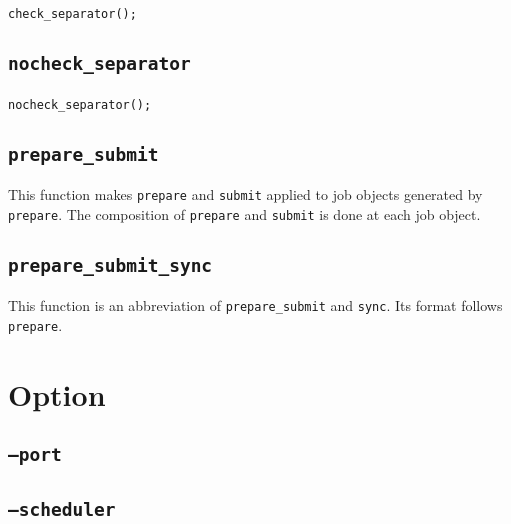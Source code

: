 \documentclass[a4paper,10pt]{report}
\begin{document}
\begin{boxnote}
\begin{alltt}
check_separator();
\end{alltt}
\end{boxnote}
\vspace{\baselineskip}

\section{\texttt{nocheck\_separator}}

\subsubsection{\format}

\begin{boxnote}
\begin{alltt}
nocheck_separator();
\end{alltt}
\end{boxnote}
\vspace{\baselineskip}

\section{\texttt{prepare\_submit}}

This function makes \texttt{prepare} and \texttt{submit} applied to
job objects generated by \texttt{prepare}.  The composition of
\texttt{prepare} and \texttt{submit} is done at each job object.

\section{\texttt{prepare\_submit\_sync}}

This function is an abbreviation of \texttt{prepare\_submit} and
\texttt{sync}.  Its format follows \texttt{prepare}.

\chapter{Option}\label{chapoption}

\section{\texttt{--port}}
\section{\texttt{--scheduler}}
\end{document}
